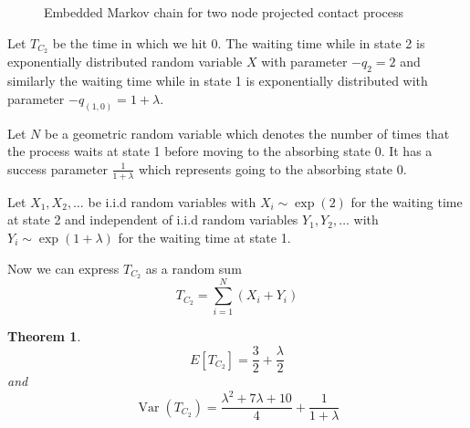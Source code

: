\documentclass{article}
\theoremstyle{plain}
\newtheorem{theorem}{Theorem}[section]
\theoremstyle{definition}
\theoremstyle{remark}
\numberwithin{equation}{section}
\newcommand{\Var}{\operatorname {Var}}
\begin{document}
\begin{figure}[h]
    \centering
    \caption{Embedded Markov chain for two node projected contact process}
    \label{fig:discrete_mc_two_contact}
\end{figure}

Let $T_{C_2}$ be the time in which we hit 0.
The waiting time while in state 2 is exponentially distributed random variable $X$ with parameter $- q_{2} = 2$ and similarly the waiting time while in state 1 is exponentially distributed with parameter $- q_{(1,0)} = 1 + \lambda$.

Let $N$ be a geometric random variable which denotes the number of times that the process waits at state 1 before moving to the absorbing state 0.
It has a success parameter $\frac{1}{1 + \lambda}$ which represents going to the absorbing state 0.

Let $X_1, X_2, \ldots$ be i.i.d random variables with
$X_i \sim \exp(2)$ for the waiting time at state 2 and independent of i.i.d random variables $Y_1, Y_2, \ldots$ with  $Y_i \sim \exp(1 + \lambda)$ for the waiting time at state 1.

Now we can express $T_{C_2}$ as a random sum
$$
T_{C_2} = \sum_{i = 1}^N (X_i + Y_i)
$$

\begin{theorem}
$$
E[T_{C_2}] = \frac{3}{2} + \frac{\lambda}{2}
$$
and
$$
\Var(T_{C_2}) = \frac{\lambda^2 + 7 \lambda + 10}{4} + \frac{1}{1 + \lambda}
$$
\end{theorem}
\end{document}
